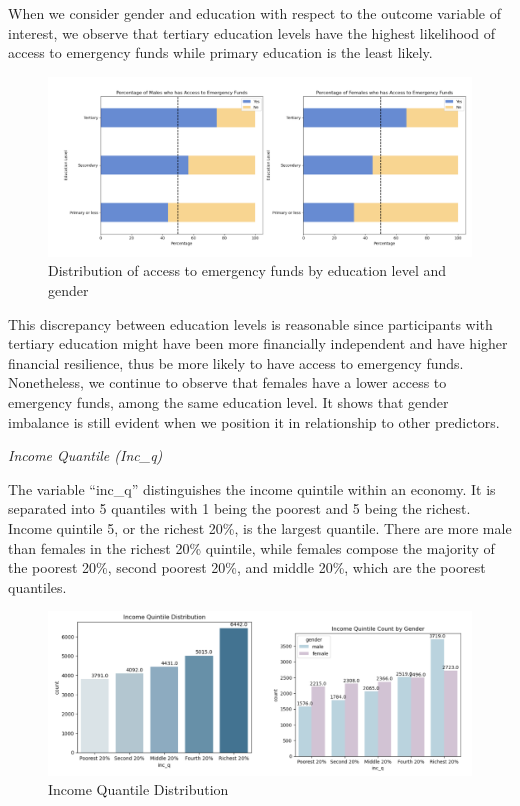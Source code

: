 \documentclass[12pt]{article}
\begin{document}
When we consider gender and education with respect to the outcome
variable of interest, we observe that tertiary education levels have the
highest likelihood of access to emergency funds while primary education
is the least likely.

\begin{figure}

{\centering \includegraphics[width=1\linewidth]{graphs/f24_graph5} 

}

\caption{Distribution of access to emergency funds by education level and gender}\label{fig:unnamed-chunk-8}
\end{figure}

This discrepancy between education levels is reasonable since
participants with tertiary education might have been more financially
independent and have higher financial resilience, thus be more likely to
have access to emergency funds. Nonetheless, we continue to observe that
females have a lower access to emergency funds, among the same education
level. It shows that gender imbalance is still evident when we position
it in relationship to other predictors.

\emph{Income Quantile (Inc\_q)}

The variable ``inc\_q'' distinguishes the income quintile within an
economy. It is separated into 5 quantiles with 1 being the poorest and 5
being the richest. Income quintile 5, or the richest 20\%, is the
largest quantile. There are more male than females in the richest 20\%
quintile, while females compose the majority of the poorest 20\%, second
poorest 20\%, and middle 20\%, which are the poorest quantiles.

\begin{figure}

{\centering \includegraphics[width=1\linewidth]{graphs/income_graph6} 

}

\caption{Income Quantile Distribution}\label{fig:unnamed-chunk-9}
\end{figure}
\end{document}
